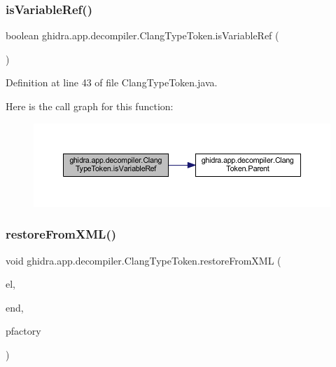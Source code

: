 \subsubsection{\texorpdfstring{isVariableRef()}{isVariableRef()}}
{\footnotesize\ttfamily boolean ghidra.\+app.\+decompiler.\+Clang\+Type\+Token.\+is\+Variable\+Ref (\begin{DoxyParamCaption}{ }\end{DoxyParamCaption})\hspace{0.3cm}{\ttfamily [inline]}}



Definition at line 43 of file Clang\+Type\+Token.\+java.

Here is the call graph for this function\+:
\nopagebreak
\begin{figure}[H]
\begin{center}
\leavevmode
\includegraphics[width=350pt]{classghidra_1_1app_1_1decompiler_1_1_clang_type_token_a7a4e9b090abd073689da89a7e22b42e7_cgraph}
\end{center}
\end{figure}
\mbox{\label{classghidra_1_1app_1_1decompiler_1_1_clang_type_token_a53a5c4775d9a1901b95b86bddbb990f0}} 
\subsubsection{\texorpdfstring{restoreFromXML()}{restoreFromXML()}}
{\footnotesize\ttfamily void ghidra.\+app.\+decompiler.\+Clang\+Type\+Token.\+restore\+From\+X\+ML (\begin{DoxyParamCaption}\item[{Xml\+Element}]{el,  }\item[{Xml\+Element}]{end,  }\item[{Pcode\+Factory}]{pfactory }\end{DoxyParamCaption})\hspace{0.3cm}{\ttfamily [inline]}}



